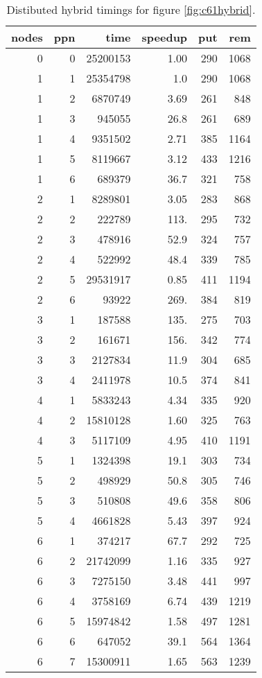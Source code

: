 \documentclass[10pt,twocolumn,a4paper]{article}
\begin{document}
\begin{table}[thb]
\centering
\caption{Distibuted hybrid timings for figure \ref{fig:c61hybrid}.}
\label{fig:c61_dist1}
\small{
\clearpage{}
\begin{tabular}{|r|r|r|r|r|r|}
\hline
 nodes & ppn & time & speedup & put & rem 
\\ \hline
 0 & 0 & 25200153 & 1.00 & 290 & 1068
\\ \hline
 1 & 1 & 25354798 & 1.0 & 290 & 1068
\\ \hline
 1 & 2 & 6870749  & 3.69 & 261 & 848
\\ \hline
 1 & 3 & 945055   & 26.8 & 261 & 689
\\ \hline
 1 & 4 & 9351502  & 2.71 & 385 & 1164
\\ \hline
 1 & 5 & 8119667  & 3.12 & 433 & 1216
\\ \hline
 1 & 6 & 689379   & 36.7 & 321 & 758
\\ \hline
 2 & 1 & 8289801  & 3.05 & 283 & 868
\\ \hline
 2 & 2 & 222789   & 113. & 295 & 732
\\ \hline
 2 & 3 & 478916   & 52.9 & 324 & 757
\\ \hline
 2 & 4 & 522992   & 48.4 & 339 & 785
\\ \hline
 2 & 5 & 29531917 & 0.85 & 411 & 1194
\\ \hline
 2 & 6 & 93922    & 269. & 384 & 819
\\ \hline
 3 & 1 & 187588   & 135. & 275 & 703
\\ \hline
 3 & 2 & 161671   & 156. & 342 & 774
\\ \hline
 3 & 3 & 2127834  & 11.9 & 304 & 685
\\ \hline
 3 & 4 & 2411978  & 10.5 & 374 & 841
\\ \hline
 4 & 1 & 5833243  & 4.34 & 335 & 920
\\ \hline
 4 & 2 & 15810128 & 1.60 & 325 & 763
\\ \hline
 4 & 3 & 5117109  & 4.95 & 410 & 1191
\\ \hline
 5 & 1 & 1324398  & 19.1 & 303 & 734
\\ \hline
 5 & 2 & 498929   & 50.8 & 305 & 746
\\ \hline
 5 & 3 & 510808   & 49.6 & 358 & 806
\\ \hline
 5 & 4 & 4661828  & 5.43 & 397 & 924
\\ \hline
 6 & 1 & 374217   & 67.7 & 292 & 725
\\ \hline
 6 & 2 & 21742099 & 1.16 & 335 & 927
\\ \hline
 6 & 3 & 7275150  & 3.48 & 441 & 997
\\ \hline
 6 & 4 & 3758169  & 6.74 & 439 & 1219
\\ \hline
 6 & 5 & 15974842 & 1.58 & 497 & 1281
\\ \hline
 6 & 6 & 647052   & 39.1 & 564 & 1364
\\ \hline
 6 & 7 & 15300911 & 1.65 & 563 & 1239
\\ \hline
\end{tabular}
\clearpage{}
}
\end{table}
\end{document}
